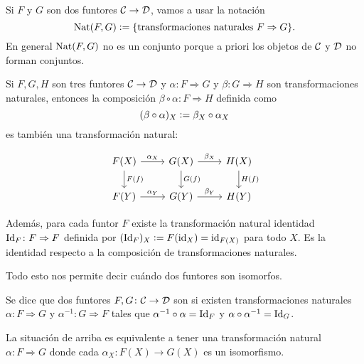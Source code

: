 \documentclass{article}
\numberwithin{equation}{section}
\theoremstyle{definition}
\begin{document}
Si $F$ y $G$ son dos funtores $\mathcal{C} \to \mathcal{D}$, vamos a usar la
notación
$$\operatorname{Nat} (F,G) \mathrel{\mathop:}= \{ \text{transformaciones naturales }F\Rightarrow G \}.$$
En general $\operatorname{Nat} (F,G)$ no es un conjunto porque a priori los objetos de
$\mathcal{C}$ y $\mathcal{D}$ no forman conjuntos.

\begin{observacion}
  Si $F,G,H$ son tres funtores $\mathcal{C} \to \mathcal{D}$ y
  $\alpha\colon F\Rightarrow G$ y $\beta\colon G\Rightarrow H$ son
  transformaciones naturales, entonces la composición
  $\beta\circ\alpha\colon F\Rightarrow H$ definida como
  $$(\beta\circ\alpha)_X \mathrel{\mathop:}= \beta_X \circ \alpha_X$$
  es también una transformación natural:

  \[ \begin{tikzcd}
      F (X)\ar{r}{\alpha_X}\ar{d}{F (f)} & G (X)\ar{d}{G (f)}\ar{r}{\beta_X} & H (X)\ar{d}{H (f)} \\
      F (Y)\ar{r}{\alpha_Y} & G (Y)\ar{r}{\beta_Y} & H (Y)
    \end{tikzcd} \]

  Además, para cada funtor $F$ existe la transformación natural identidad
  $\operatorname{Id}_F\colon F\Rightarrow F$ definida por
  $(\operatorname{Id}_F)_X \mathrel{\mathop:}= F (\mathrm{id}_{X}) = \mathrm{id}_{F (X)}$ para todo $X$. Es la identidad
  respecto a la composición de transformaciones naturales.
\end{observacion}

Todo esto nos permite decir cuándo dos funtores son isomorfos.

\begin{definicion}
  Se dice que dos funtores $F,G\colon \mathcal{C} \to \mathcal{D}$ son
   si existen transformaciones naturales
  $\alpha\colon F\Rightarrow G$ y $\alpha^{-1}\colon G\Rightarrow F$ tales que
  $\alpha^{-1}\circ\alpha = \operatorname{Id}_F$ y $\alpha\circ\alpha^{-1} = \operatorname{Id}_G$.
\end{definicion}

La situación de arriba es equivalente a tener una transformación natural
$\alpha\colon F\Rightarrow G$ donde cada $\alpha_X\colon F (X)\to G (X)$ es un
isomorfismo.
\end{document}
